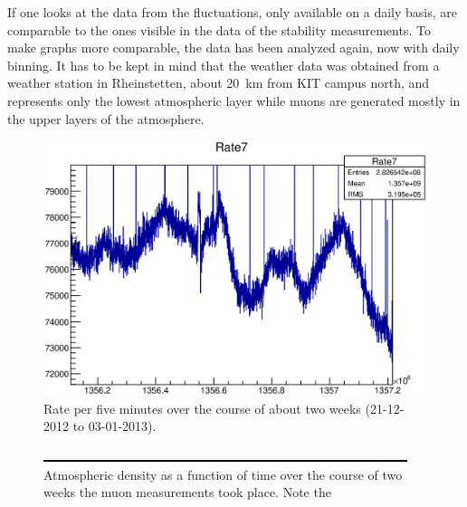   If one looks at the data from \cite{wetterCom} the fluctuations, only available on a daily basis, are comparable to the ones visible in the data of the stability measurements. To make graphs more comparable, the data has been analyzed again, now with daily binning. It has to be kept in mind that the weather data was obtained from a weather station in Rheinstetten, about \SI{20}{\kilo\meter} from KIT campus north, and represents only the lowest atmospheric layer while muons are generated mostly in the upper layers of the atmosphere.
  \begin{figure}
	\includegraphics[width = 0.9 \textwidth]{graphics/setup/stability.eps}
  	\caption[Muon module stability]{Rate per five minutes over the course of about two weeks (21-12-2012 to 03-01-2013). }
  \end{figure}

  \begin{figure}
	\centering
  	\includegraphics[width = 0.9 \textwidth]{graphics/dummy.eps}
  	\caption[Atmospheric density stability measurement]{Atmospheric density as a function of time over the course of two weeks the muon measurements took place. Note the }
  	\label{fig:moduleStability}
  \end{figure}


